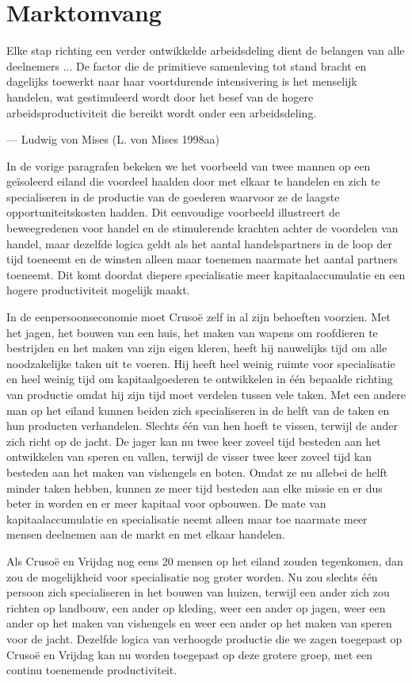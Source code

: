 \documentclass[
  a5paper,
  smalldemyvopaper,11pt,twoside,onecolumn,openright,extrafontsizes,
hidelinks]{memoir}
\begin{document}
\section{Marktomvang}\label{marktomvang}

Elke stap richting een verder ontwikkelde arbeidsdeling dient de
belangen van alle deelnemers ... De factor die de primitieve samenleving
tot stand bracht en dagelijks toewerkt naar haar voortdurende
intensivering is het menselijk handelen, wat gestimuleerd wordt door het
besef van de hogere arbeidsproductiviteit die bereikt wordt onder een
arbeidsdeling.

--- Ludwig von Mises (L. von Mises 1998aa)

In de vorige paragrafen bekeken we het voorbeeld van twee mannen op een
geïsoleerd eiland die voordeel haalden door met elkaar te handelen en
zich te specialiseren in de productie van de goederen waarvoor ze de
laagste opportuniteitskosten hadden. Dit eenvoudige voorbeeld
illustreert de beweegredenen voor handel en de stimulerende krachten
achter de voordelen van handel, maar dezelfde logica geldt als het
aantal handelspartners in de loop der tijd toeneemt en de winsten alleen
maar toenemen naarmate het aantal partners toeneemt. Dit komt doordat
diepere specialisatie meer kapitaalaccumulatie en een hogere
productiviteit mogelijk maakt.

In de eenpersoonseconomie moet Crusoë zelf in al zijn behoeften
voorzien. Met het jagen, het bouwen van een huis, het maken van wapens
om roofdieren te bestrijden en het maken van zijn eigen kleren, heeft
hij nauwelijks tijd om alle noodzakelijke taken uit te voeren. Hij heeft
heel weinig ruimte voor specialisatie en heel weinig tijd om
kapitaalgoederen te ontwikkelen in één bepaalde richting van productie
omdat hij zijn tijd moet verdelen tussen vele taken. Met een andere man
op het eiland kunnen beiden zich specialiseren in de helft van de taken
en hun producten verhandelen. Slechts één van hen hoeft te vissen,
terwijl de ander zich richt op de jacht. De jager kan nu twee keer
zoveel tijd besteden aan het ontwikkelen van speren en vallen, terwijl
de visser twee keer zoveel tijd kan besteden aan het maken van
vishengels en boten. Omdat ze nu allebei de helft minder taken hebben,
kunnen ze meer tijd besteden aan elke missie en er dus beter in worden
en er meer kapitaal voor opbouwen. De mate van kapitaalaccumulatie en
specialisatie neemt alleen maar toe naarmate meer mensen deelnemen aan
de markt en met elkaar handelen.

Als Crusoë en Vrijdag nog eens 20 mensen op het eiland zouden
tegenkomen, dan zou de mogelijkheid voor specialisatie nog groter
worden. Nu zou slechts één persoon zich specialiseren in het bouwen van
huizen, terwijl een ander zich zou richten op landbouw, een ander op
kleding, weer een ander op jagen, weer een ander op het maken van
vishengels en weer een ander op het maken van speren voor de jacht.
Dezelfde logica van verhoogde productie die we zagen toegepast op Crusoë
en Vrijdag kan nu worden toegepast op deze grotere groep, met een
continu toenemende productiviteit.
\end{document}
